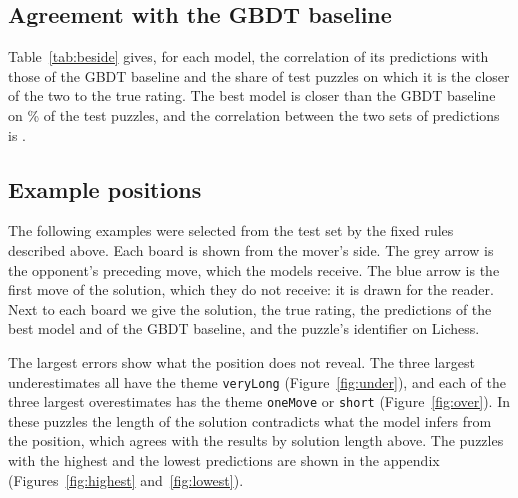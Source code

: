 \documentclass[11pt]{article}
\begin{document}
\subsection{Agreement with the GBDT baseline}

Table~\ref{tab:beside} gives, for each model, the correlation of its
predictions with those of the GBDT baseline and the share of test puzzles on
which it is the closer of the two to the true rating. The best model is
closer than the GBDT baseline on \% of the test
puzzles, and the correlation between the two sets of predictions is
.

\begin{table}[htbp]\centering\small
{}
\caption{Agreement with the GBDT baseline on the test set: the correlation
between the two models' predictions, and the share of puzzles on which the
model is closer to the true rating than the baseline.}
\label{tab:beside}
\end{table}

\subsection{Example positions}
\label{sec:positions}

The following examples were selected from the test set by the fixed rules
described above. Each board is shown from the mover's side. The grey arrow is
the opponent's preceding move, which the models receive. The blue arrow is
the first move of the solution, which they do not receive: it is drawn for
the reader. Next to each board we give the solution, the true rating, the
predictions of the best model and of the GBDT baseline, and the puzzle's
identifier on Lichess.

The largest errors show what the position does not reveal. The three largest
underestimates all have the theme \texttt{veryLong}
(Figure~\ref{fig:under}), and each of the three largest overestimates has
the theme \texttt{oneMove} or \texttt{short} (Figure~\ref{fig:over}). In
these puzzles the length of the solution contradicts what the model infers
from the position, which agrees with the results by solution length above.
The puzzles with the highest and the lowest predictions are shown in the
appendix (Figures~\ref{fig:highest} and~\ref{fig:lowest}).

\end{document}
